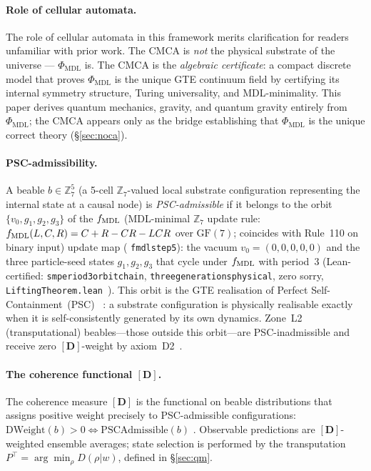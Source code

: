 \documentclass[11pt]{article}
\theoremstyle{remark}
\newcommand{\PHIMDL}{\Phi_{\mathrm{MDL}}}
\newcommand{\ZS}{\mathbb{Z}_7}
\newcommand{\lean}[1]{%
  \penalty-100
  \begingroup\def\_{\textunderscore\allowbreak}\texttt{#1}\endgroup}
\newcommand{\fmdl}{f_{\rm MDL}}
\begin{document}
\paragraph{Role of cellular automata.}
The role of cellular automata in this framework merits clarification for readers
unfamiliar with prior work.  The CMCA is \emph{not} the physical substrate of
the universe --- $\PHIMDL$ is.  The CMCA is the \emph{algebraic certificate}: a
compact discrete model that proves $\PHIMDL$ is the unique GTE continuum field by
certifying its internal symmetry structure, Turing universality, and MDL-minimality.
This paper derives quantum mechanics, gravity, and quantum gravity entirely from
$\PHIMDL$; the CMCA appears only as the bridge establishing that $\PHIMDL$ is the
unique correct theory (\S\ref{sec:noca}).

\paragraph{PSC-admissibility.}
A beable $b\in\ZS^5$ (a 5-cell $\ZS$-valued local substrate configuration
representing the internal state at a causal node) is
\emph{PSC-admissible} if it belongs to the orbit
$\{v_0,g_1,g_2,g_3\}$ of the $\fmdl$ (MDL-minimal $\ZS$ update rule:
$f_{\rm MDL}(L,C,R) = C+R-CR-LCR$ over $\mathrm{GF}(7)$; coincides with
Rule~110 on binary input) update map
(\lean{fmdl\_step5}): the vacuum $v_0=(0,0,0,0,0)$ and the three
particle-seed states $g_1,g_2,g_3$ that cycle under $\fmdl$ with
period~$3$ (Lean-certified: \lean{sm\_period3\_orbit\_chain},
\lean{three\_generations\_physical}, zero sorry,
\lean{LiftingTheorem.lean}~\cite{SpivackCMCA}).
This orbit is the GTE realisation of Perfect Self-Containment~(PSC)~%
\cite{SpivackGTEMobius}: a substrate configuration is physically
realisable exactly when it is self-consistently generated by its own
dynamics.  Zone~L2 (transputational) beables---those outside this
orbit---are PSC-inadmissible and receive zero $[\mathbf{D}]$-weight by
axiom~D2~\cite{SpivackGTEMobius}.

\paragraph{The coherence functional $[\mathbf{D}]$.}
The coherence measure $[\mathbf{D}]$ is the functional on beable
distributions that assigns positive weight precisely to PSC-admissible
configurations:
$\mathrm{DWeight}(b)>0\Leftrightarrow \mathrm{PSCAdmissible}(b)$
\cite{SpivackGTEMobius}.
Observable predictions are $[\mathbf{D}]$-weighted ensemble averages;
state selection is performed by the transputation
$P^\top=\arg\min_\rho D(\rho|w)$, defined in \S\ref{sec:qm}.
\end{document}
